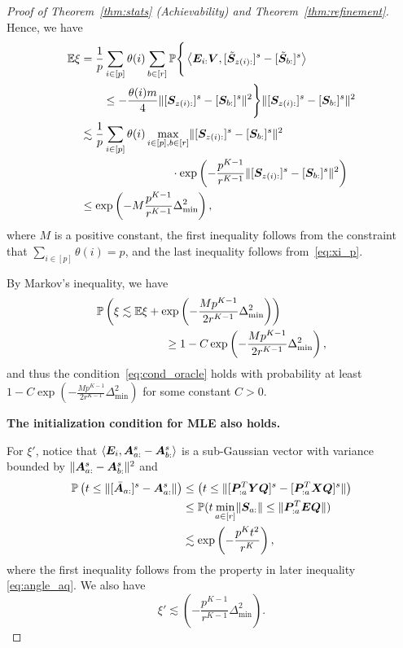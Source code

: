 \documentclass[journal]{IEEEtran}
\theoremstyle{definition}
\theoremstyle{definition}
\newcommand{\of}[1]{\left(#1\right)}
\newcommand{\ang}[1]{\left\langle#1\right\rangle}
\begin{document}
\begin{proof}[Proof of Theorem~\ref{thm:stats} (Achievability) and Theorem~\ref{thm:refinement}]
    
    Hence, we have 
    \begin{align}
        \bbE \xi & =  \frac{1}{p} \sum_{i \in [p]} \theta(i) \sum_{b \in [r]} \bbP \Bigg\{  \ang{ \mE_{i:} \mV, [  \tilde \mS_{z(i):} ]^s - [  \tilde \mS_{b:} ]^s }  \\
        & \quad \quad  \leq - \frac{\theta(i) m}{4} \onormSize{}{ [ \mS_{z(i):}  ]^s - [ \mS_{b:}  ]^s  }^2 \Bigg\} \onormSize{}{ [ \mS_{z(i):}  ]^s - [ \mS_{ b:}  ]^s  }^2 \\
        &\lesssim \frac{1}{p} \sum_{i \in [p]}  \theta(i) \max_{i \in [p], b \in [r]}  \onormSize{}{ [ \mS_{z(i):}  ]^s - [ \mS_{b:}  ]^s  }^2 \\
        & \quad \quad \quad \quad  \quad \quad \quad \quad \cdot \exp \of{  - \frac{p^{K-1}}{r^{K-1}}   \onormSize{}{ [ \mS_{z(i):}  ]^s - [ \mS_{b:}  ]^s  }^2 } \\
        & \leq \exp \of{  - M \frac{p^{K-1}}{r^{K-1}}   \Delta_{\min}^2 }, \label{eq:constant_M}
    \end{align}
    where $M$ is a positive constant, the first inequality follows from the constraint that $\sum_{i \in [p]} \theta(i) = p$, and the last inequality follows from~\eqref{eq:xi_p}.
    
    By Markov's inequality, we have 
    \begin{align}
        & \bbP\of{ \xi \lesssim \bbE \xi + \exp \of{  - \frac{M p^{K-1}}{2 r^{K-1}}   \Delta_{\min}^2 } } \\
        & \quad \quad  \quad \quad \quad \quad \geq 1 -  C \exp \of{  - \frac{M p^{K-1}}{2 r^{K-1}}   \Delta_{\min}^2 },
    \end{align}
    and thus the condition~\eqref{eq:cond_oracle} holds with probability at least $1 -  C \exp \of{  - \frac{M p^{K-1}}{2 r^{K-1}}   \Delta_{\min}^2 }$ for some constant $C > 0$.
    
    {
      
    
    \textbf{The initialization condition for MLE also holds.}
    
    For $\xi'$, notice that $\ang{\mE_i, \mA^s_{a:} - \mA^s_{b:} }$ is a sub-Gaussian vector with variance bounded by $\lVert\bm A^s_{a:} - \bm A^s_{b:}\rVert^2$ and 
    \begin{align}
        \bbP \of{ t \leq \onormSize{}{ [\bar \mA_{a:}]^s - \mA^s_{a:} }} & \leq \of{ t \leq \onormSize{}{ [\mP_{:a}^T \mY \mQ]^s - [\mP_{:a}^T \mX \mQ]^s }} \\
        &\leq \bbP( t \min_{a \in [r]}\onormSize{}{\mS_{a:}} \leq \onormSize{}{\mP_{:a}^T \mE \mQ} ) \\
        &\lesssim \exp \of{ - \frac{p^{K}t^2}{r^{K}}},
    \end{align}
   where the first inequality follows from the property in later inequality \eqref{eq:angle_aq}. We also have 
   \begin{equation}
        \xi' \lesssim  \of{  -  \frac{p^{K-1}}{r^{K-1}}   \Delta_{\min}^2 }.
   \end{equation}
    
}
\end{proof}
\end{document}

